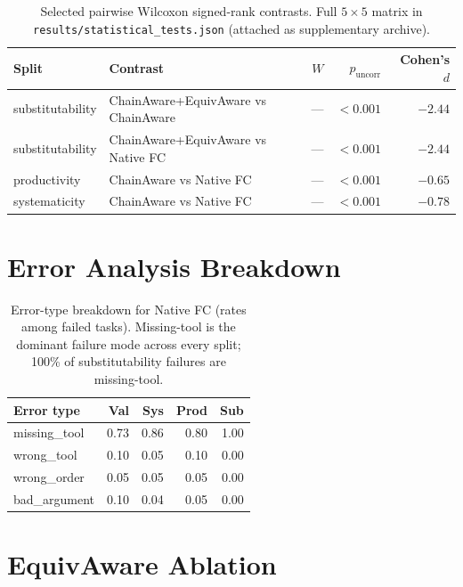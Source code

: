 ﻿\documentclass{article}
\begin{document}
\begin{table}[h]
    \centering
    \small
    \begin{tabular}{llrrr}
        \toprule
        Split & Contrast & $W$ & $p_{\text{uncorr}}$ & Cohen's $d$ \\
        \midrule
        substitutability & ChainAware+EquivAware vs ChainAware  & --- & $< 0.001$ & $-2.44$ \\
        substitutability & ChainAware+EquivAware vs Native FC    & --- & $< 0.001$ & $-2.44$ \\
        productivity     & ChainAware vs Native FC               & --- & $< 0.001$ & $-0.65$ \\
        systematicity    & ChainAware vs Native FC               & --- & $< 0.001$ & $-0.78$ \\
        \bottomrule
    \end{tabular}
    \caption{Selected pairwise Wilcoxon signed-rank contrasts. Full $5 \times 5$ matrix in \texttt{results/statistical\_tests.json} (attached as supplementary archive).}
    \label{tab:wilcoxon}
\end{table}

\section{Error Analysis Breakdown}
\label{app:errors}

\begin{table}[h]
    \centering
    \small
    \begin{tabular}{lrrrr}
        \toprule
        Error type & Val & Sys & Prod & Sub \\
        \midrule
        missing\_tool  & 0.73 & 0.86 & 0.80 & 1.00 \\
        wrong\_tool    & 0.10 & 0.05 & 0.10 & 0.00 \\
        wrong\_order   & 0.05 & 0.05 & 0.05 & 0.00 \\
        bad\_argument  & 0.10 & 0.04 & 0.05 & 0.00 \\
        \bottomrule
    \end{tabular}
    \caption{Error-type breakdown for Native FC (rates among failed tasks). Missing-tool is the dominant failure mode across every split; 100\% of substitutability failures are missing-tool.}
    \label{tab:errors}
\end{table}

\section{EquivAware Ablation}
\label{app:equiv-ablation}
\end{document}
